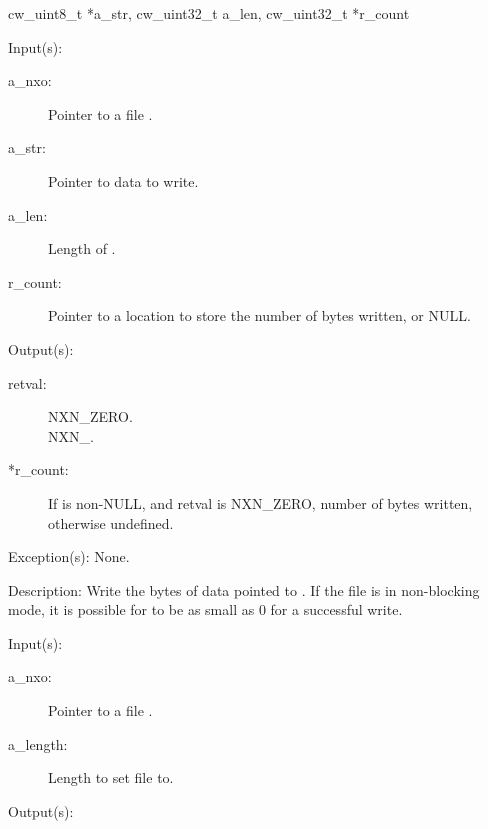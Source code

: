 \begin{capi}
{{cw\_uint8\_t *a\_str, cw\_uint32\_t a\_len, cw\_uint32\_t *r\_count}}
	\begin{capilist}
	\item[Input(s): ]
		\begin{description}\item[]
		\item[a\_nxo: ]
			Pointer to a file .
		\item[a\_str: ]
			Pointer to data to write.
		\item[a\_len: ]
			Length of .
		\item[r\_count: ]
			Pointer to a location to store the number of bytes
			written, or NULL.
		\end{description}
	\item[Output(s): ]
		\begin{description}\item[]
		\item[retval: ]
			\begin{description}\item[]
			\item[NXN\_ZERO.]
			\item[NXN\_.]
			\end{description}
		\item[*r\_count: ]
			If  is non-NULL, and retval is NXN\_ZERO,
			number of bytes written, otherwise undefined.
		\end{description}
	\item[Exception(s): ] None.
	\item[Description: ]
		Write the  bytes of data pointed to .
		If the file is in non-blocking mode, it is possible for
		 to be as small as 0 for a successful write.
	\end{capilist}
\label{nxo_file_truncate}
	\begin{capilist}
	\item[Input(s): ]
		\begin{description}\item[]
		\item[a\_nxo: ]
			Pointer to a file \classname{nxo}.
		\item[a\_length: ]
			Length to set file to.
		\end{description}
	\item[Output(s): ]

\end{capilist}
\end{capi}
